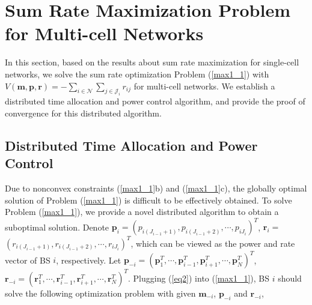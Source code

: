 \documentclass[journal]{IEEEtran}
\begin{document}
\section{Sum Rate Maximization Problem for Multi-cell Networks}

In this section, based on the results about sum rate maximization for single-cell networks, we solve the sum rate optimization Problem (\ref{max1_1}) with $V(\pmb m, \pmb p, \pmb r)=-\sum_{i \in \mathcal N} \sum_{j\in\mathcal J_i} r_{ij}$ for multi-cell networks.
We establish a distributed time allocation and power control algorithm, and provide the proof of convergence for this distributed algorithm.


\subsection{Distributed Time Allocation and Power Control}
\label{section_rate_1}
Due to nonconvex constraints (\ref{max1_1}b) and (\ref{max1_1}c),
the globally optimal solution of Problem (\ref{max1_1}) is difficult to be effectively obtained.
To solve Problem (\ref{max1_1}), we provide a novel distributed algorithm to obtain a suboptimal solution.
Denote $\pmb{p}_i=(p_{i (J_{i-1}+1)}, p_{i (J_{i-1}+2)}, \cdots, p_{i J_{i}})^T$,
$\pmb{r}_i=$ $(r_{i (J_{i-1}+1)}, r_{i (J_{i-1}+2)}, \cdots, r_{i J_{i}})^T$, which can be viewed as the power and rate vector of BS $i$, respectively.
Let $\pmb p_{-i}=(\pmb p_1^T, \cdots, \pmb p_{i-1}^T, \pmb p_{i+1}^T, \cdots, \pmb p_N^T)^T$, $\pmb r_{-i}=(\pmb r_1^T, \cdots, \pmb r_{i-1}^T, \pmb r_{i+1}^T, \cdots, \pmb r_N^T)^T$.
Plugging (\ref{eq2}) into (\ref{max1_1}),
BS $i$ should solve the following optimization problem with given $\pmb m_{-i}$, $\pmb p_{-i}$ and $\pmb r_{-i}$,
\end{document}
